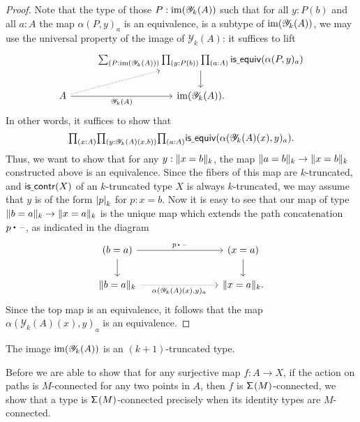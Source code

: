 \begin{proof}
Note that the type of those $P:\im(\mathscr{Y}_k(A))$ such that for all $y:P(b)$ and all $a:A$ the map $\alpha(P,y)_a$ is an equivalence, is a subtype of $\im(\mathscr{Y}_k(A))$, we may use the universal property of the image of $\mathscr{Y}_k(A)$: it suffices to lift
\begin{equation*}
\begin{tikzcd}
& \sm{P:\im(\mathscr{Y}_k(A))}\prd{y:P(b)}{a:A}\isequiv(\alpha(P,y)_a) \arrow[d] \\
A \arrow[ur,densely dotted] \arrow[r,swap,"\mathscr{Y}_k(A)"] & \im(\mathscr{Y}_k(A)).
\end{tikzcd}
\end{equation*}
In other words, it suffices to show that 
\begin{equation*}
\prd{x:A}{y:\mathscr{Y}_k(A)(x,b)}{a:A}\isequiv(\alpha(\mathscr{Y}_k(A)(x),y)_a).
\end{equation*}
Thus, we want to show that for any $y:\trunc{k}{x=b}$, the map $\trunc{k}{a=b}\to\trunc{k}{x=b}$ constructed above is an equivalence.
Since the fibers of this map are $k$-truncated, and $\iscontr(X)$ of an $k$-truncated type $X$ is always $k$-truncated, we may assume that $y$ is of the form $\tproj{k}{p}$ for $p:x=b$. 
Now it is easy to see that our map of type $\trunc{k}{b=a}\to\trunc{k}{x=a}$ is the unique map which
extends the path concatenation $\ct{p}{\blank}$, as indicated in the diagram
\begin{equation*}
\begin{tikzcd}[column sep=8em]
(b=a) \arrow[r,"\ct{p}{\blank}"] \arrow[d] & (x=a) \arrow[d] \\
\trunc{k}{b=a} \arrow[r,densely dotted,swap,"{\alpha(\mathscr{Y}_k(A)(x),y)_a}"] & \trunc{k}{x=a}.
\end{tikzcd}
\end{equation*}
Since the top map is an equivalence, it follows that the map $\alpha(\mathscr{Y}_k(A)(x),y)_a$ is an equivalence.
\end{proof}

\begin{cor}\label{cor:truncated}
The image $\im(\mathscr{Y}_k(A))$ is an $(k+1)$-truncated type. 
\end{cor}

Before we are able to show that for any surjective map $f:A\to X$, if the action on paths is $M$-connected for any two points in $A$, then $f$ is $\susp(M)$-connected, we show that a type is $\susp(M)$-connected precisely when its identity types are $M$-connected.

